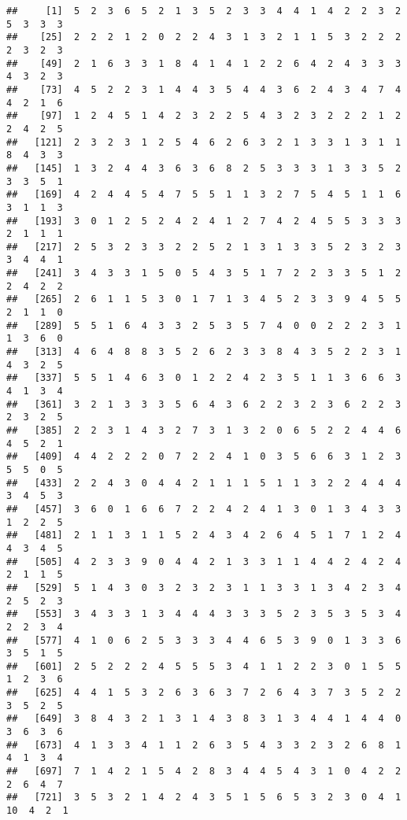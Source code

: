 \documentclass[
]{article}
\begin{document}
\begin{verbatim}
##     [1]  5  2  3  6  5  2  1  3  5  2  3  3  4  4  1  4  2  2  3  2  5  3  3  3
##    [25]  2  2  2  1  2  0  2  2  4  3  1  3  2  1  1  5  3  2  2  2  2  3  2  3
##    [49]  2  1  6  3  3  1  8  4  1  4  1  2  2  6  4  2  4  3  3  3  4  3  2  3
##    [73]  4  5  2  2  3  1  4  4  3  5  4  4  3  6  2  4  3  4  7  4  4  2  1  6
##    [97]  1  2  4  5  1  4  2  3  2  2  5  4  3  2  3  2  2  2  1  2  2  4  2  5
##   [121]  2  3  2  3  1  2  5  4  6  2  6  3  2  1  3  3  1  3  1  1  8  4  3  3
##   [145]  1  3  2  4  4  3  6  3  6  8  2  5  3  3  3  1  3  3  5  2  3  3  5  1
##   [169]  4  2  4  4  5  4  7  5  5  1  1  3  2  7  5  4  5  1  1  6  3  1  1  3
##   [193]  3  0  1  2  5  2  4  2  4  1  2  7  4  2  4  5  5  3  3  3  2  1  1  1
##   [217]  2  5  3  2  3  3  2  2  5  2  1  3  1  3  3  5  2  3  2  3  3  4  4  1
##   [241]  3  4  3  3  1  5  0  5  4  3  5  1  7  2  2  3  3  5  1  2  2  4  2  2
##   [265]  2  6  1  1  5  3  0  1  7  1  3  4  5  2  3  3  9  4  5  5  2  1  1  0
##   [289]  5  5  1  6  4  3  3  2  5  3  5  7  4  0  0  2  2  2  3  1  1  3  6  0
##   [313]  4  6  4  8  8  3  5  2  6  2  3  3  8  4  3  5  2  2  3  1  4  3  2  5
##   [337]  5  5  1  4  6  3  0  1  2  2  4  2  3  5  1  1  3  6  6  3  4  1  3  4
##   [361]  3  2  1  3  3  3  5  6  4  3  6  2  2  3  2  3  6  2  2  3  2  3  2  5
##   [385]  2  2  3  1  4  3  2  7  3  1  3  2  0  6  5  2  2  4  4  6  4  5  2  1
##   [409]  4  4  2  2  2  0  7  2  2  4  1  0  3  5  6  6  3  1  2  3  5  5  0  5
##   [433]  2  2  4  3  0  4  4  2  1  1  1  5  1  1  3  2  2  4  4  4  3  4  5  3
##   [457]  3  6  0  1  6  6  7  2  2  4  2  4  1  3  0  1  3  4  3  3  1  2  2  5
##   [481]  2  1  1  3  1  1  5  2  4  3  4  2  6  4  5  1  7  1  2  4  4  3  4  5
##   [505]  4  2  3  3  9  0  4  4  2  1  3  3  1  1  4  4  2  4  2  4  2  1  1  5
##   [529]  5  1  4  3  0  3  2  3  2  3  1  1  3  3  1  3  4  2  3  4  2  5  2  3
##   [553]  3  4  3  3  1  3  4  4  4  3  3  3  5  2  3  5  3  5  3  4  2  2  3  4
##   [577]  4  1  0  6  2  5  3  3  3  4  4  6  5  3  9  0  1  3  3  6  3  5  1  5
##   [601]  2  5  2  2  2  4  5  5  5  3  4  1  1  2  2  3  0  1  5  5  1  2  3  6
##   [625]  4  4  1  5  3  2  6  3  6  3  7  2  6  4  3  7  3  5  2  2  3  5  2  5
##   [649]  3  8  4  3  2  1  3  1  4  3  8  3  1  3  4  4  1  4  4  0  3  6  3  6
##   [673]  4  1  3  3  4  1  1  2  6  3  5  4  3  3  2  3  2  6  8  1  4  1  3  4
##   [697]  7  1  4  2  1  5  4  2  8  3  4  4  5  4  3  1  0  4  2  2  2  6  4  7
##   [721]  3  5  3  2  1  4  2  4  3  5  1  5  6  5  3  2  3  0  4  1 10  4  2  1

\end{verbatim}
\end{document}
